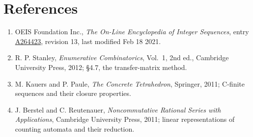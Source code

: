 \documentclass[11pt]{article}
\theoremstyle{definition}
\begin{document}
\section{References}

\begin{enumerate}

\item OEIS Foundation Inc., \emph{The On-Line Encyclopedia of Integer Sequences}, entry \href{https://oeis.org/A264423}{A264423}, revision 13, last modified Feb 18 2021.

\item R. P. Stanley, \emph{Enumerative Combinatorics}, Vol.~1, 2nd ed., Cambridge University Press, 2012; \S4.7, the transfer-matrix method.

\item M. Kauers and P. Paule, \emph{The Concrete Tetrahedron}, Springer, 2011; C-finite sequences and their closure properties.

\item J. Berstel and C. Reutenauer, \emph{Noncommutative Rational Series with Applications}, Cambridge University Press, 2011; linear representations of counting automata and their reduction.

\end{enumerate}
\end{document}
